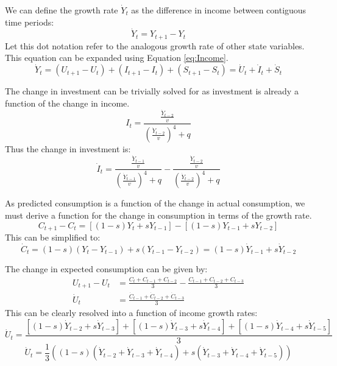 We can define the growth rate $\dot Y_t$ as the difference in income between contiguous time periods:
\begin{equation}
    \dot Y_t=Y_{t+1}-Y_t
\end{equation}
Let this dot notation refer to the analogous growth rate of other state variables. This equation can be expanded using Equation \ref{eq:Income}.
\begin{equation*}
    \dot Y_t=(U_{t+1}-U_t)+(I_{t+1}-I_t)+(S_{t+1}-S_t)=\dot U_t+\dot I_t+\dot S_t
\end{equation*}

The change in investment can be trivially solved for as investment is already a function of the change in income.
\begin{equation*}
    I_t=\frac{\frac{\dot Y_{t-2}}{v}}{\left(\frac{\dot Y_{t-2}}{v}\right)^4+q}
\end{equation*}
Thus the change in investment is:
\begin{equation}
    \dot I_t=\frac{\frac{\dot Y_{t-1}}{v}}{\left(\frac{\dot Y_{t-1}}{v}\right)^4+q}-\frac{\frac{\dot Y_{t-2}}{v}}{\left(\frac{\dot Y_{t-2}}{v}\right)^4+q}
\end{equation}

As predicted consumption is a function of the change in actual consumption, we must derive a function for the change in consumption in terms of the growth rate.
\begin{equation*}
    C_{t+1}-C_t=[(1-s)Y_{t}+sY_{t-1}]-[(1-s)Y_{t-1}+sY_{t-2}]
\end{equation*}
This can be simplified to:
\begin{equation}
    \dot C_t=(1-s)(Y_{t}-Y_{t-1})+s(Y_{t-1}-Y_{t-2})=(1-s)\dot Y_{t-1} + s\dot Y_{t-2}
\end{equation}

The change in expected consumption can be given by:
\begin{align*}
    U_{t+1}-U_{t}&=\frac{C_{t}+C_{t-1}+C_{t-2}}{3}-\frac{C_{t-1}+C_{t-2}+C_{t-3}}{3}\\
    \dot U_t&=\frac{\dot C_{t-1}+\dot C_{t-2}+\dot C_{t-3}}{3}
\end{align*}
This can be clearly resolved into a function of income growth rates:
\begin{equation*}
    \dot U_t=\frac{[(1-s)\dot Y_{t-2} + s\dot Y_{t-3}]+[(1-s)\dot Y_{t-3} + s\dot Y_{t-4}]+[(1-s)\dot Y_{t-4} + s\dot Y_{t-5}]}{3}
\end{equation*}
\begin{equation}
    \dot U_t=\frac{1}{3}\left((1-s)(\dot Y_{t-2}+\dot Y_{t-3}+\dot Y_{t-4})+s(\dot Y_{t-3}+\dot Y_{t-4}+\dot Y_{t-5})\right)
\end{equation}

